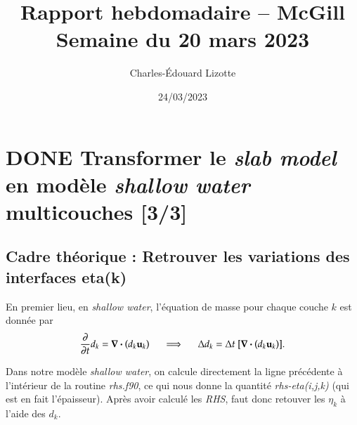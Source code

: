 \documentclass{article}
\author{Charles-Édouard Lizotte}
\date{24/03/2023}
\title{Rapport hebdomadaire -- McGill\\\medskip
\large Semaine du 20 mars 2023}
\numberwithin{equation}{section}
\begin{document}
\maketitle
\tableofcontents


\section{{\bfseries\sffamily DONE} Transformer le \emph{slab model} en modèle \emph{shallow water} multicouches [3/3]}
\label{sec:orgde13bcf}
\subsection{\textbf{Cadre théorique} : Retrouver les variations des interfaces eta(k)}
\label{sec:org1c66ddf}
En premier lieu, en \emph{shallow water}, l'équation de masse pour chaque couche \(k\) est donnée par
\begin{equation}
\pdv{}{t} d_k = \divergence (d_k\vb{u}_k)
\hspace{0.5cm}\Longrightarrow\hspace{0.5cm}
\Delta d_k = \Delta t \ \qty[ \divergence (d_k \vb{u}_k)].
\end{equation}

Dans notre modèle \emph{shallow water}, on calcule directement la ligne précédente à l'intérieur de la routine \emph{rhs.f90}, ce qui nous donne la quantité \emph{rhs-eta(i,j,k)} (qui est en fait l'épaisseur).
Après avoir calculé les \emph{RHS}, faut donc retouver les \(\eta_k\) à l'aide des \(d_k\).
\end{document}
